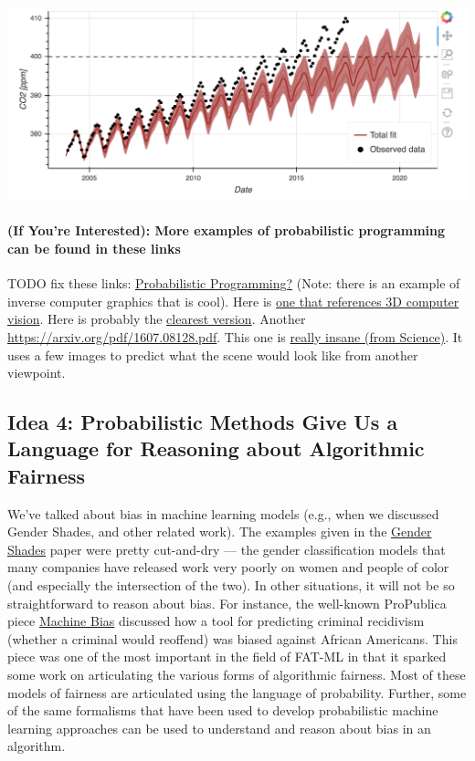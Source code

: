 \documentclass[assignment01_Solutions]{subfiles}
\begin{document}
\begin{center}
\includegraphics[width=0.8\linewidth]{figures/maunaloa}
\end{center}

\paragraph{(If You're Interested): More examples of probabilistic programming can be found in these links}


\bi
\item TODO fix these links: \href{https://arxiv.org/pdf/1809.10756.pdf}{Probabilistic Programming?} (Note: there is an example of inverse computer graphics that is cool).  Here is \href{https://www.youtube.com/watch?v=DImI6l_0yiM}{one that references 3D computer vision}.  Here is probably the \href{http://mrkulk.github.io/www_cvpr15/}{clearest version}.  Another \href{cool example}{https://arxiv.org/pdf/1607.08128.pdf}.  This one is \href{https://science.sciencemag.org/content/sci/360/6394/1204.full.pdf}{really insane (from Science)}.   It uses a few images to predict what the scene would look like from another viewpoint.
\ei


\subsection*{Idea 4: Probabilistic Methods Give Us a Language for Reasoning about Algorithmic Fairness}

We've talked about bias in machine learning models (e.g., when we discussed Gender Shades, and other related work).  The examples given in the \href{http://gendershades.org/overview.html}{Gender Shades} paper were pretty cut-and-dry --- the gender classification models that many companies have released work very poorly on women and people of color (and especially the intersection of the two).  In other situations, it will not be so straightforward to reason about bias. For instance, the well-known ProPublica piece \href{https://www.propublica.org/article/machine-bias-risk-assessments-in-criminal-sentencing}{Machine Bias} discussed how a tool for predicting criminal recidivism (whether a criminal would reoffend) was biased against African Americans.  This piece was one of the most important in the field of FAT-ML in that it sparked some work on articulating the various forms of algorithmic fairness.  Most of these models of fairness are articulated using the language of probability.  Further, some of the same formalisms that have been used to develop probabilistic machine learning approaches can be used to understand and reason about bias in an algorithm.
\end{document}
